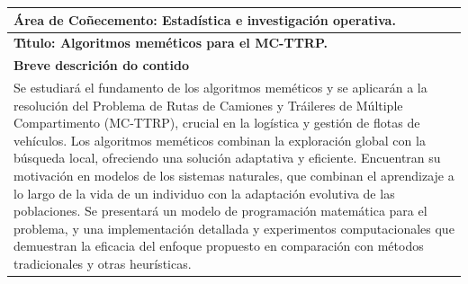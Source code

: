 \documentclass[11pt,a4paper]{book}
\theoremstyle{definition}
\theoremstyle{remark}
\begin{document}
\begingroup
\renewcommand*{\arraystretch}{2.2}
\begin{tabular}{|l|}
	\hline
	
	{\bf \'Area de Co\~necemento:  \/ } Estadística e investigación operativa.\\ \hline
	\begin{minipage}{11.5cm}
		{\vspace*{.2cm}
			\bf T\'{\i}tulo:   \/ \bf Algoritmos meméticos para el MC-TTRP.
			\vspace{.2cm}}
	\end{minipage}\\ \hline
	\bf Breve descrici\'on do contido\\ \hline
	\begin{minipage}{11.5cm}
		{\vspace*{.2cm}
        Se estudiará el fundamento de los algoritmos meméticos y se aplicarán a la resolución del Problema de Rutas de Camiones y Tráileres de Múltiple Compartimento (MC-TTRP), crucial en la logística y gestión de flotas de vehículos. Los algoritmos meméticos combinan la exploración global con la búsqueda local, ofreciendo una solución adaptativa y eficiente. Encuentran su motivación en modelos de los sistemas naturales, que combinan el aprendizaje a lo largo de la vida de un individuo con la adaptación evolutiva de las poblaciones. Se presentará un modelo de programación matemática para el problema, y una implementación detallada y experimentos computacionales que demuestran la eficacia del enfoque propuesto en comparación con métodos tradicionales y otras heurísticas.
		
		\vspace{.2cm}}
	\end{minipage}\\ \hline




\end{tabular}
\endgroup
\end{document}
